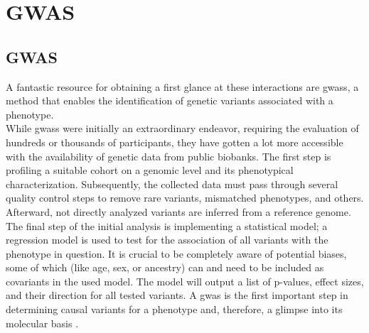     \section{GWAS}
    \label{sec:gwas}

    \subsection{GWAS}
    \label{subsec:gwas_general}
    A fantastic resource for obtaining a first glance at these interactions are \acp{gwas}, a method that enables the identification of genetic variants associated with a phenotype.\\
    While \acp{gwas} were initially an extraordinary endeavor, requiring the evaluation of hundreds or thousands of participants, they have gotten a lot more accessible with the availability of genetic data from public biobanks. The first step is profiling a suitable cohort on a genomic level and its phenotypical characterization. Subsequently, the collected data must pass through several quality control steps to remove rare variants, mismatched phenotypes, and others. Afterward, not directly analyzed variants are inferred from a reference genome. The final step of the initial analysis is implementing a statistical model; a regression model is used to test for the association of all variants with the phenotype in question. It is crucial to be completely aware of potential biases, some of which (like age, sex, or ancestry) can and need to be included as covariants in the used model. \cite{uffelmannGenomewideAssociationStudies2021, flintGWAS2013} The model will output a list of p-values, effect sizes, and their direction for all tested variants. A \ac{gwas} is the first important step in determining causal variants for a phenotype and, therefore, a glimpse into its molecular basis \cite{uffelmannGenomewideAssociationStudies2021}.

